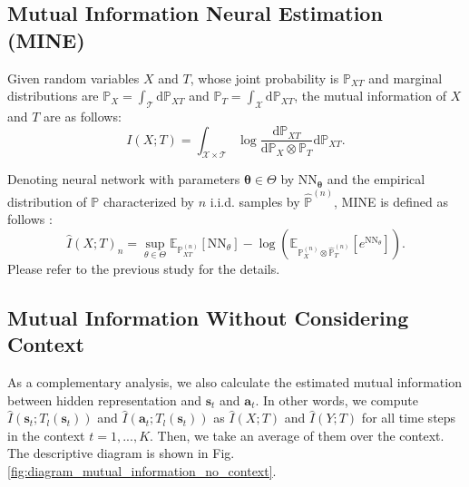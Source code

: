 \documentclass{article}
\begin{document}
\subsection{Mutual Information Neural Estimation (MINE)}
\label{appendix:definition-mutual-information}
Given random variables $X$ and $T$, whose joint probability is $\mathbb{P}_{X T}$ and marginal distributions are $\mathbb{P}_{X}=\int_{\mathcal{T}} \mathrm{d} \mathbb{P}_{X T}$ and $\mathbb{P}_{T}=\int_{\mathcal{X}} \mathrm{d} \mathbb{P}_{X T}$, the mutual information of $X$ and $T$ are as follows:
\begin{equation}
    I(X ; T)=\int_{\mathcal{X} \times \mathcal{T}} \log \frac{\mathrm{d} \mathbb{P}_{X T}}{\mathrm{d} \mathbb{P}_{X} \otimes \mathbb{P}_{T}} \mathrm{d} \mathbb{P}_{X T}.
\end{equation}

Denoting neural network with parameters $\bm{\theta} \in \Theta$ by $\text{NN}_{\bm{\theta}}$ and the empirical distribution of $\mathbb{P}$ characterized by $n$ i.i.d. samples by $\hat{\mathbb{P}}^{(n)}$, MINE is defined as follows \cite{pmlr-v80-belghazi18a}:
\begin{equation}
\hat{I}(X ; T)_{n}=\sup _{\theta \in \Theta} \mathbb{E}_{\mathbb{P}_{X T}^{(n)}}\left[\text{NN}_{\theta}\right]-\log \left(\mathbb{E}_{\mathbb{P}_{X}^{(n)} \otimes \hat{\mathbb{P}}_{T}^{(n)}}\left[e^{\text{NN}_{\theta}}\right]\right).
\end{equation}
Please refer to the previous study \cite{pmlr-v80-belghazi18a} for the details.


\subsection{Mutual Information Without Considering Context}
As a complementary analysis, we also calculate the estimated mutual information between hidden representation and $\bm{s}_t$ and $\bm{a}_t$. In other words, we compute $\hat{I}(\bm{s}_t;  T_l(\bm{s}_t))$ and $\hat{I}(\bm{a}_t;  T_l(\bm{s}_t))$ as $\hat{I}(X; T)$ and $\hat{I}(Y; T)$ for all time steps in the context $t = 1, ..., K$. Then, we take an average of them over the context. The descriptive diagram is shown in Fig. \ref{fig:diagram_mutual_information_no_context}.
\end{document}

